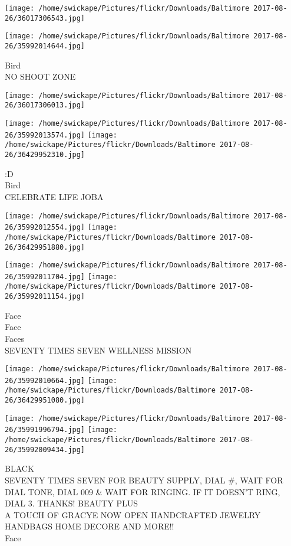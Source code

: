 \documentclass[10pt,letterpaper]{article}
\begin{document}
\texttt{[image: /home/swickape/Pictures/flickr/Downloads/Baltimore 2017-08-26/36017306543.jpg]}

\vspace{0.25in}
\texttt{[image: /home/swickape/Pictures/flickr/Downloads/Baltimore 2017-08-26/35992014644.jpg]}

Bird\\
NO SHOOT ZONE\\
\pagebreak

\texttt{[image: /home/swickape/Pictures/flickr/Downloads/Baltimore 2017-08-26/36017306013.jpg]}

\vspace{0.25in}
\texttt{[image: /home/swickape/Pictures/flickr/Downloads/Baltimore 2017-08-26/35992013574.jpg]}
\texttt{[image: /home/swickape/Pictures/flickr/Downloads/Baltimore 2017-08-26/36429952310.jpg]}

:D\\
Bird\\
CELEBRATE LIFE JOBA\\
\pagebreak

\texttt{[image: /home/swickape/Pictures/flickr/Downloads/Baltimore 2017-08-26/35992012554.jpg]}
\texttt{[image: /home/swickape/Pictures/flickr/Downloads/Baltimore 2017-08-26/36429951880.jpg]}

\texttt{[image: /home/swickape/Pictures/flickr/Downloads/Baltimore 2017-08-26/35992011704.jpg]}
\texttt{[image: /home/swickape/Pictures/flickr/Downloads/Baltimore 2017-08-26/35992011154.jpg]}

Face\\
Face\\
Faces\\
SEVENTY TIMES SEVEN WELLNESS MISSION\\
\pagebreak

\texttt{[image: /home/swickape/Pictures/flickr/Downloads/Baltimore 2017-08-26/35992010664.jpg]}
\texttt{[image: /home/swickape/Pictures/flickr/Downloads/Baltimore 2017-08-26/36429951080.jpg]}

\texttt{[image: /home/swickape/Pictures/flickr/Downloads/Baltimore 2017-08-26/35991996794.jpg]}
\texttt{[image: /home/swickape/Pictures/flickr/Downloads/Baltimore 2017-08-26/35992009434.jpg]}

BLACK\\
SEVENTY TIMES SEVEN FOR BEAUTY SUPPLY, DIAL \#, WAIT FOR DIAL TONE, DIAL 009 \& WAIT FOR RINGING.  IF IT DOESN'T RING, DIAL 3.  THANKS!  BEAUTY PLUS\\
A TOUCH OF GRACYE NOW OPEN HANDCRAFTED JEWELRY HANDBAGS HOME DECORE AND MORE!!\\
Face\\
\pagebreak
\end{document}
